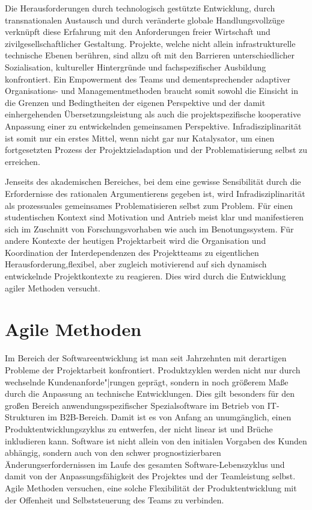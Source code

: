 \documentclass[a4paper,11pt]{article}
\begin{document}
Die Herausforderungen durch technologisch gestützte Entwicklung, durch
transnationalen Austausch und durch veränderte globale Handlungsvollzüge
verknüpft diese Erfahrung mit den Anforderungen freier Wirtschaft und
zivilgesellschaftlicher Gestaltung. Projekte, welche nicht allein
infrastrukturelle technische Ebenen berühren, sind allzu oft mit den Barrieren
unterschiedlicher Sozialisation, kultureller Hintergründe und fachspezifischer
Ausbildung konfrontiert. Ein Empowerment des Teams und dementsprechender
adaptiver Organisations- und Managementmethoden braucht somit sowohl die
Einsicht in die Grenzen und Bedingtheiten der eigenen Perspektive und der
damit einhergehenden Übersetzungsleistung als auch die projektspezifische
kooperative Anpassung einer zu entwickelnden gemeinsamen
Perspektive. Infradisziplinarität ist somit nur ein erstes Mittel, wenn nicht
gar nur Katalysator, um einen fortgesetzten Prozess der Projektzieladaption
und der Problematisierung selbst zu erreichen.

Jenseits des akademischen Bereiches, bei dem eine gewisse Sensibilität durch
die Erfordernisse des rationalen Argumentierens gegeben ist, wird
Infradisziplinarität als prozessuales gemeinsames Problematisieren selbst zum
Problem. Für einen studentischen Kontext sind Motivation und Antrieb meist
klar und manifestieren sich im Zuschnitt von Forschungsvorhaben wie auch im
Benotungssystem. Für andere Kontexte der heutigen Projektarbeit wird die
Organisation und Koordination der Interdependenzen des Projektteams zu
eigentlichen Herausforderung,flexibel, aber zugleich motivierend auf sich
dynamisch entwickelnde Projektkontexte zu reagieren. Dies wird durch die
Entwicklung agiler Methoden versucht.

\section*{Agile Methoden}

Im Bereich der Softwareentwicklung ist man seit Jahrzehnten mit derartigen
Probleme der Projektarbeit konfrontiert. Produktzyklen werden nicht nur durch
wechselnde Kundenanforde"|rungen geprägt, sondern in noch größerem Maße durch
die Anpassung an technische Entwicklungen. Dies gilt besonders für den großen
Bereich anwendungsspezifischer Spezialsoftware im Betrieb von IT-Strukturen im
B2B-Bereich.  Damit ist es von Anfang an unumgänglich, einen
Produktentwicklungszyklus zu entwerfen, der nicht linear ist und Brüche
inkludieren kann. Software ist nicht allein von den initialen Vorgaben des
Kunden abhängig, sondern auch von den schwer prognostizierbaren
Änderungserfordernissen im Laufe des gesamten Software-Lebenszyklus und damit
von der Anpassungsfähigkeit des Projektes und der Teamleistung selbst. Agile
Methoden versuchen, eine solche Flexibilität der Produktentwicklung mit der
Offenheit und Selbststeuerung des Teams zu verbinden.
\end{document}
